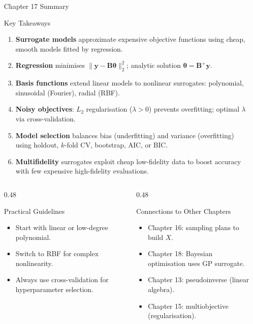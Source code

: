 \documentclass[aspectratio=169,10pt]{beamer}
\newcommand{\vy}{\mathbf{y}}
\newcommand{\btheta}{\boldsymbol{\theta}}
\newcommand{\bB}{\mathbf{B}}
\begin{document}
\begin{frame}{Chapter 17 Summary}
  \begin{block}{Key Takeaways}
    \begin{enumerate}
      \item \textbf{Surrogate models} approximate expensive objective functions
            using cheap, smooth models fitted by regression.
      \item \textbf{Regression} minimises $\|\vy - \bB\btheta\|_2^2$;
            analytic solution $\btheta = \bB^+\vy$.
      \item \textbf{Basis functions} extend linear models to nonlinear surrogates:
            polynomial, sinusoidal (Fourier), radial (RBF).
      \item \textbf{Noisy objectives}: $L_2$ regularisation ($\lambda > 0$) prevents
            overfitting; optimal $\lambda$ via cross-validation.
      \item \textbf{Model selection} balances bias (underfitting) and variance (overfitting)
            using holdout, $k$-fold CV, bootstrap, AIC, or BIC.
      \item \textbf{Multifidelity} surrogates exploit cheap low-fidelity data to
            boost accuracy with few expensive high-fidelity evaluations.
    \end{enumerate}
  \end{block}

  \begin{columns}[T]
    \begin{column}{0.48\textwidth}
      \begin{alertblock}{Practical Guidelines}
        \begin{itemize}
          \item Start with linear or low-degree polynomial.
          \item Switch to RBF for complex nonlinearity.
          \item Always use cross-validation for hyperparameter selection.
        \end{itemize}
      \end{alertblock}
    \end{column}
    \begin{column}{0.48\textwidth}
      \begin{exampleblock}{Connections to Other Chapters}
        \begin{itemize}
          \item Chapter 16: sampling plans to build $X$.
          \item Chapter 18: Bayesian optimisation uses GP surrogate.
          \item Chapter 13: pseudoinverse (linear algebra).
          \item Chapter 15: multiobjective (regularisation).
        \end{itemize}
      \end{exampleblock}
    \end{column}
  \end{columns}
\end{frame}
\end{document}
